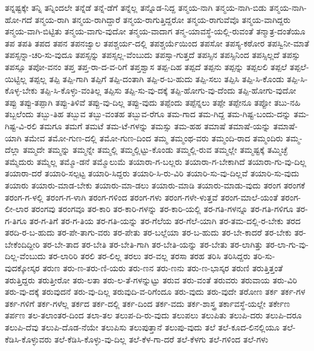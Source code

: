 ತನ್ನಷ್ಟಕ್ಕೇ
ತನ್ನಿ
ತನ್ನಿಂದಲೇ
ತನ್ನೆಡೆ
ತನ್ನೆ-ಡೆಗೆ
ತನ್ನೆಲ್ಲ
ತನ್ನೊಡ-ನಿದ್ದ
ತನ್ಮಯ-ನಾಗಿ
ತನ್ಮಯ-ನಾಗಿ-ಬಿಡು
ತನ್ಮಯ-ನಾಗಿ-ಹೋ-ಗದೆ
ತನ್ಮಯ-ರಾಗಿ
ತನ್ಮಯ-ರಾಗಿದ್ದಾರೆ
ತನ್ಮಯ-ರಾಗುತ್ತಿದ್ದರೋ
ತನ್ಮಯ-ರಾಗುವೆವೊ
ತನ್ಮಯ-ವಾಗಿದ್ದರು
ತನ್ಮಯ-ವಾಗಿ-ಬಿಟ್ಟಿತು
ತನ್ಮಯ-ವಾಗು-ವುದೋ
ತನ್ಮಯ-ವಾದಾಗ
ತನ್ಮ-ಯಾವಸ್ಥೆ-ಯಲ್ಲಿ-ರುವಂತೆ
ತನ್ಮಾತ್ರ-ದಂತೆಯೂ
ತಪ
ತಪತಿ
ತಪದ
ತಪನ
ತಪನಜ್ವಾಲ
ತಪಶ್ಚರ್ಯ-ದಲ್ಲಿ
ತಪಶ್ಚರ್ಯೆಯಿಂದ
ತಪಸೋ
ತಪಸ್ಯ-ಕಠೋರ
ತಪಸ್ವಿನೀ-ಮಾತೆ
ತಪಸ್ಸನ್ನಾ-ಚರಿ-ಸು-ವುದೂ
ತಪಸ್ಸನ್ನು
ತಪಸ್ಸಲ್ಲ-ವೆಂಬುದು
ತಪಸ್ಸಾ-ಗುತ್ತದೆ
ತಪಸ್ಸಿನ
ತಪಸ್ಸಿನಿಂದ
ತಪಸ್ಸಿಲ್ಲದೆ
ತಪಸ್ಸು
ತಪಸ್ಸೂ
ತಪೋ-ವನಂ
ತಪ್ತ
ತಪ್ತ-ರಾ-ದ-ವ-ರಿಗೆ
ತಪ್ತಶ್ವಾಸ
ತಪ್ಪ-ದಿಹ
ತಪ್ಪದೆ
ತಪ್ಪನು
ತಪ್ಪನ್ನು
ತಪ್ಪಲಲಿ
ತಪ್ಪಲೆ
ತಪ್ಪಲೆ-ಯಿಟ್ಟಿಲ್ಲ
ತಪ್ಪಲ್ಲ
ತಪ್ಪಿ
ತಪ್ಪಿ-ಗಾಗಿ
ತಪ್ಪಿಗೆ
ತಪ್ಪಿ-ದಂತಾಗಿ
ತಪ್ಪಿ-ರ-ಬ-ಹುದು
ತಪ್ಪಿ-ಸಲು
ತಪ್ಪಿಸಿ
ತಪ್ಪಿ-ಸಿ-ಕೊಂಡು
ತಪ್ಪಿ-ಸಿ-ಕೊಳ್ಳ-ಬೇಕು
ತಪ್ಪಿ-ಸಿ-ಕೊಳ್ಳು-ವಂತಿಲ್ಲ
ತಪ್ಪಿಸು
ತಪ್ಪಿ-ಸು-ವು-ದಕ್ಕೆ
ತಪ್ಪಿ-ಹೋಗು-ವು-ದೆಂದು
ತಪ್ಪಿ-ಹೋಗು-ವುದೋ
ತಪ್ಪು
ತಪ್ಪು-ತಪ್ಪಾಗಿ
ತಪ್ಪು-ತಿಳಿವೆ
ತಪ್ಪು-ವು-ದಿಲ್ಲ
ತಪ್ಪು-ವುದು
ತಪ್ಪೆಂದು
ತಪ್ಪೆನ್ನಲು
ತಪ್ಪೇ
ತಪ್ಪೇನೂ
ತಪ್ಪೋ
ತಬು-ನಹಿ
ತಬ್ಬಲೆಂದು
ತಬ್ಬು-ತಿಹ
ತಬ್ಬುವ
ತಬ್ಬು-ವಂತಹ
ತಬ್ಬುವ-ರೆಗೂ
ತಮ-ಗಾದ
ತಮ-ಗಿದ್ದ
ತಮ-ಗಿಷ್ಟ-ಬಂದು-ದನ್ನು
ತಮ-ಗಿಷ್ಟ-ವಿ-ರಲಿ
ತಮಗೂ
ತಮಗೆ
ತಮಟೆ
ತಮ-ಟೆ-ಗಳನ್ನು
ತಮಸ್ಸು
ತಮ-ಹಹ
ತಮಾಷೆ
ತಮಾಷೆ-ಯನ್ನು
ತಮಾಷೆ-ಯಾಗಿ
ತಮೇವ
ತಮೋ-ಗುಣ-ದಲ್ಲಿ
ತಮೋ-ಗುಣ-ದಿಂದ
ತಮ್ಮ
ತಮ್ಮಂಥ-ವರು
ತಮ್ಮಂದಿ-ರಾದ
ತಮ್ಮಂದಿರು
ತಮ್ಮ-ದೆಲ್ಲಾ
ತಮ್ಮದೇ
ತಮ್ಮನ್ನು
ತಮ್ಮನ್ನೇ
ತಮ್ಮಲ್ಲಿ
ತಮ್ಮಲ್ಲಿಟ್ಟು-ಕೊಂಡು
ತಮ್ಮಲ್ಲಿ-ರುವ
ತಮ್ಮಲ್ಲೇ
ತಮ್ಮಷ್ಟಕ್ಕೆ
ತಮ್ಮಿಚ್ಛೆ
ತಮ್ಮೆದುರು
ತಮ್ಮೆಲ್ಲ
ತಮ್ಮೊ-ಡನೆ
ತಮ್ಮೊಲುಮೆ
ತಯಾರಾ-ಗ-ಬಲ್ಲರು
ತಯಾರಾ-ಗ-ಬೇಕಾಗಿದೆ
ತಯಾರಾ-ಗು-ವು-ದಿಲ್ಲ
ತಯಾರಾ-ದರೆ
ತಯಾರಿ-ಸಲ್ಪಟ್ಟ
ತಯಾರಿ-ಸಿದ್ದರು
ತಯಾರಿ-ಸಿ-ರು-ವಿರಿ
ತಯಾರಿ-ಸು-ವು-ದಿಲ್ಲವೆ
ತಯಾರಿ-ಸು-ವುದು
ತಯಾರು
ತಯಾರು-ಮಾಡ-ಬೇಕು
ತಯಾರು-ಮಾ-ಡಲು
ತಯಾರು-ಮಾಡಿ
ತಯಾರು-ಮಾಡು-ವುದು
ತರಂಗ
ತರಂಗಕೆ
ತರಂಗ-ಗ-ಳಲ್ಲಿ
ತರಂಗ-ಗ-ಳಾಗಿ
ತರಂಗ-ಗಳಿಂದ
ತರಂಗ-ಗಳು
ತರಂಗ-ಗಳೇ-ಳುತ್ತವೆ
ತರಂಗ-ಮಾಲೆ-ಯಂತೆ
ತರಂಗ-ಲೀ-ಲಾರ
ತರಂಗವು
ತರಂಗವೂ
ತರ-ಕಾರಿ
ತರ-ಕಾರಿ-ಗಳನ್ನು
ತರ-ಕಾರಿ-ಯಲ್ಲಿ
ತರ-ಗತಿ-ಗಳನ್ನೂ
ತರ-ಗತಿ-ಗಳಿಗೂ
ತರ-ಗ-ತಿಗೂ
ತರ-ಗ-ತಿಗೆ
ತರ-ಗ-ತಿಯ
ತರ-ಗತಿ-ಯನ್ನು
ತರ-ಗೆಲೆಯ
ತರ-ಗೆಲೆ-ಯಾಗಿ
ತರ-ತಮ-ದಲ್ಲಿ-ರ-ಬೇಕು
ತರದ
ತರದಿ-ರ-ಬ-ಹುದು
ತರ-ಪೇ-ತಾಗು-ವರು
ತರ-ಪೇತು
ತರ-ಬಲ್ಲೆಯಾ
ತರ-ಬ-ಹುದು
ತರ-ಬೇ-ಕಾದರೆ
ತರ-ಬೇಕು
ತರ-ಬೇಕೆಂದಿದ್ದೀರಿ
ತರ-ಬೇ-ತಾದ
ತರ-ಬೇತಿ
ತರ-ಬೇತಿ-ಗಾಗಿ
ತರ-ಬೇತಿ-ಯನ್ನು
ತರ-ಬೇತು
ತರ-ಲಾಗಿತ್ತು
ತರ-ಲಾ-ಗು-ವು-ದಿಲ್ಲ-ವೆಂಬುದು
ತರ-ಲಾರಿರಿ
ತರಲಿ
ತರ-ಲಿಲ್ಲ
ತರಲು
ತರ-ವಲ್ಲ
ತರಸಾ
ತರಹ
ತರಿಸಿ
ತರಿಸಿದ್ದರು
ತರಿ-ಸು-ವುದಕ್ಕೋಸ್ಕರ
ತರುಣ
ತರು-ಣ-ತರು-ಣಿ-ಯರು
ತರು-ಣನ
ತರು-ಣನು
ತರು-ಣ-ಭಾಸ್ಕರ
ತರುಣಿ
ತರುತ್ತಿತ್ತಂತೆ
ತರುತ್ತಿದ್ದರು
ತರುತ್ತೀರೋ
ತರು-ಲತಾ
ತರು-ಲ-ತೆ-ಗಳನ್ನುಟ್ಟು
ತರುವ
ತರು-ವಂತೆ
ತರುವರು
ತರುವಾಯ
ತರು-ವಿರಿ
ತರು-ವು-ದಕ್ಕೆ
ತರುವುದನೆ
ತರು-ವು-ದಿಲ್ಲ
ತರುವುದಿ-ವ-ರಿಗೆಂದೂ
ತರು-ವುದು
ತರು-ವುದೇ
ತರೋಣ
ತರ್ಕ
ತರ್ಕ-ಗಳ
ತರ್ಕ-ಗಳಿಗೆ
ತರ್ಕ-ಗಳೆಲ್ಲ
ತರ್ಕದ
ತರ್ಕ-ದಲ್ಲಿ
ತರ್ಕ-ದಿಂದ
ತರ್ಕ-ವದು
ತರ್ಕ-ಶಾಸ್ತ್ರ
ತರ್ಕಾವಸ್ಥೆ-ಯಲ್ಲೇ
ತರ್ಕೇಣ
ತರ್ಪಣ
ತಲ-ತಲಾಂತರ-ದಿಂದ
ತಲಾ-ತಲ
ತಲುಪ-ದಿ-ರು-ವುದು
ತಲುಪಲು
ತಲುಪಿತು
ತಲುಪಿ-ದರು
ತಲುಪಿ-ದರೂ
ತಲುಪಿ-ದೆವು
ತಲುಪಿ-ದೊಡ-ನೆಯೇ
ತಲುಪಿಸು
ತಲುಪುತ್ತಾನೆ
ತಲುಪು-ವುದು
ತಲೆ
ತಲೆ-ಕೂದ-ಲಿನಲ್ಲಿಯೂ
ತಲೆ-ಕೆಡಿಸಿ-ಕೊಳ್ಳುವರು
ತಲೆ-ಕೆಡಿಸಿ-ಕೊಳ್ಳು-ವು-ದಿಲ್ಲ
ತಲೆ-ಕೆಳ-ಗಾ-ದರೆ
ತಲೆ-ಕೆಳಗು
ತಲೆ-ಗಳಿಂದ
ತಲೆ-ಗಳು

